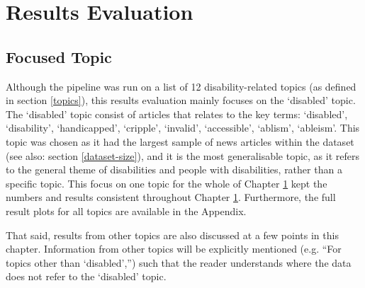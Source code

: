\documentclass{report}
\begin{document}



\chapter{Results Evaluation} \label{Results Evaluation}  %

\section{Focused Topic} \label{Focused topic}
Although the pipeline was run on a list of 12 disability-related topics (as defined in section \ref{topics}), this results evaluation mainly focuses on the `disabled' topic.
The `disabled' topic consist of articles that relates to the key terms: `disabled', `disability', `handicapped', `cripple', `invalid', `accessible', `ablism', `ableism'.
This topic was chosen as it had the largest sample of news articles within the dataset (see also: section \ref{dataset-size}), and it is the most generalisable topic, as it refers to the general theme of disabilities and people with disabilities, rather than a specific topic.
This focus on one topic for the whole of Chapter \ref{Results Evaluation} kept the numbers and results consistent throughout Chapter \ref{Results Evaluation}.
Furthermore, the full result plots for all topics are available in the Appendix.

That said, results from other topics are also discussed at a few points in this chapter.
Information from other topics will be explicitly mentioned (e.g. ``For topics other than `disabled','') such that the reader understands where the data does not refer to the `disabled' topic.
\end{document}
